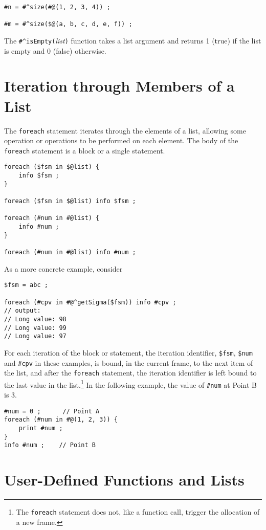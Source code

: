 \begin{Verbatim}
#n = #^size(#@(1, 2, 3, 4)) ;

#m = #^size($@(a, b, c, d, e, f)) ;
\end{Verbatim}

The \verb!#^isEmpty(!\emph{list}\verb!)! function takes a list argument and
returns 1 (true) if the list is empty and 0 (false) otherwise.

\section{Iteration through Members of a List}


The \texttt{foreach} statement iterates through the elements of a list, allowing
some operation or operations to be performed on each element.  The body of
the \texttt{foreach} statement is a block or a single statement.

\begin{Verbatim}
foreach ($fsm in $@list) {
    info $fsm ;
}

foreach ($fsm in $@list) info $fsm ;

foreach (#num in #@list) {
    info #num ;
}

foreach (#num in #@list) info #num ;
\end{Verbatim}

\noindent
As a more concrete example, consider

\begin{Verbatim}
$fsm = abc ;

foreach (#cpv in #@^getSigma($fsm)) info #cpv ;
// output:
// Long value: 98
// Long value: 99
// Long value: 97
\end{Verbatim}

For each iteration of the block or statement, the iteration identifier,
\verb!$fsm!, \verb!$num! and \verb!#cpv! in these examples, is bound, in
the current frame, to the next item of the list, and after the
\texttt{foreach} statement, the iteration identifier is left bound to the
last value in the list.\footnote{The \texttt{foreach} statement does not,
like a function call, trigger the allocation of a new frame.}  In the
following example, the value of \verb!#num! at Point B is 3.

\begin{Verbatim}
#num = 0 ;      // Point A
foreach (#num in #@(1, 2, 3)) {
	print #num ;
}
info #num ;    // Point B
\end{Verbatim}

\section{User-Defined Functions and Lists}


